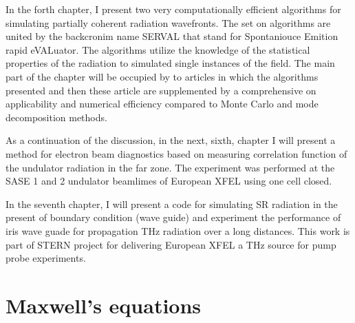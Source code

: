 In the forth chapter, I present two very computationally efficient algorithms for simulating partially coherent radiation wavefronts. The set on algorithms are united by the backcronim name SERVAL that stand for Spontaniouce Emition rapid eVALuator. The algorithms utilize the knowledge of the statistical properties of the radiation to simulated single instances of the field. The main part of the chapter will be occupied by to articles in which the algorithms presented and then these article are supplemented by a comprehensive on applicability and numerical efficiency compared to Monte Carlo and mode decomposition methods. 

As a continuation of the discussion, in the next, sixth, chapter I will present a method for electron beam diagnostics based on measuring correlation function of the undulator radiation in the far zone. The experiment was performed at the SASE 1 and 2 undulator beamlimes of European XFEL using one cell closed. 

In the seventh chapter, I will present a code for simulating SR radiation in the present of boundary condition (wave guide) and experiment the performance of iris wave guade for propagation THz radiation over a long distances. This work is part of STERN project for delivering European XFEL a THz source for pump probe experiments.  

\label{chapter:introduction}

\section{Maxwell's equations}
